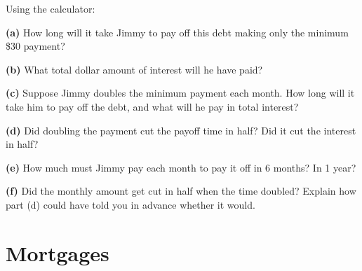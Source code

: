 \documentclass[12pt]{ximera}
\begin{document}
\begin{problem}
Using the calculator:

\begin{prompt}
\textbf{(a)} How long will it take Jimmy to pay off this debt making only the minimum
\$30 payment?
\begin{freeResponse}
\end{freeResponse}
\end{prompt}

\begin{prompt}
\textbf{(b)} What total dollar amount of interest will he have paid?
\begin{freeResponse}
\end{freeResponse}
\end{prompt}

\begin{prompt}
\textbf{(c)} Suppose Jimmy doubles the minimum payment each month. How long will it
take him to pay off the debt, and what will he pay in total interest?
\begin{freeResponse}
\end{freeResponse}
\end{prompt}

\begin{prompt}
\textbf{(d)} Did doubling the payment cut the payoff time in half? Did it cut the
interest in half?
\begin{freeResponse}
\end{freeResponse}
\end{prompt}

\begin{prompt}
\textbf{(e)} How much must Jimmy pay each month to pay it off in 6 months? In 1 year?
\begin{freeResponse}
\end{freeResponse}
\end{prompt}

\begin{prompt}
\textbf{(f)} Did the monthly amount get cut in half when the time doubled? Explain
how part (d) could have told you in advance whether it would.
\begin{freeResponse}
\end{freeResponse}
\end{prompt}
\end{problem}

\section*{Mortgages}
\end{document}
